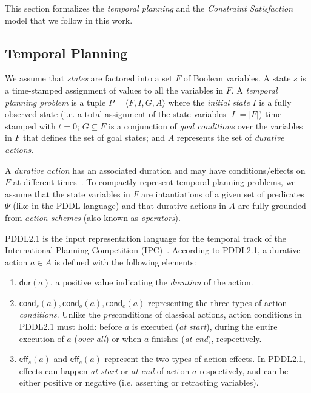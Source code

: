 \documentclass{ecai}
\newcommand{\tup}[1]{{\langle #1 \rangle}}
\newcommand{\eff}{\mathsf{eff}}    %
\newcommand{\cond}{\mathsf{cond}}  %
\newcommand{\dur}{\mathsf{dur}}    %
\begin{document}
This section formalizes the {\em temporal planning} and the {\em Constraint Satisfaction} model that we follow in this work.

\subsection{Temporal Planning}
\label{sec:temporalplanning}

We assume that {\em states} are factored into a set $F$ of Boolean variables. A state $s$ is a time-stamped assignment of values to all the variables in $F$. A {\em temporal planning problem} is a tuple $P=\tup{F,I,G,A}$ where the {\em initial state} $I$ is a fully observed state (i.e. a total assignment of the state variables $|I|=|F|$) time-stamped with $t=0$; $G \subseteq F$ is a conjunction of {\em goal conditions} over the variables in $F$ that defines the set of goal states; and $A$ represents the set of {\em durative actions}.

A {\em durative action} has an associated duration and may have conditions/effects on $F$ at different times~\cite{garrido2009constraint,vidal2006branching}. To compactly represent temporal planning problems, we assume that the state variables in $F$ are intantiations of a given set of predicates $\Psi$ (like in the PDDL language) and that durative actions in $A$ are fully grounded from {\em action schemes} (also known as {\em operators}).

PDDL2.1 is the input representation language for the temporal track of the International Planning Competition (IPC)~\cite{fox2003pddl2,ghallab2004automated}. According to PDDL2.1, a durative action $a\in A$ is defined with the following elements:
\begin{enumerate}
\item $\dur(a)$, a positive value indicating the {\em duration} of the action.

\item $\cond_s(a), \cond_o(a), \cond_e(a)$ representing the three types of action {\em conditions}. Unlike the \emph{pre}conditions of classical actions, action conditions in PDDL2.1 must hold: before $a$ is executed ({\em at start}), during the entire execution of $a$ ({\em over all}) or when $a$ finishes ({\em at end}), respectively. 

\item $\eff_s(a)$ and $\eff_e(a)$ represent the two types of action effects. In PDDL2.1, effects can happen {\em at start} or {\em at end} of action $a$ respectively, and can be either positive or negative (i.e. asserting or retracting variables). 

\end{enumerate}
\end{document}
